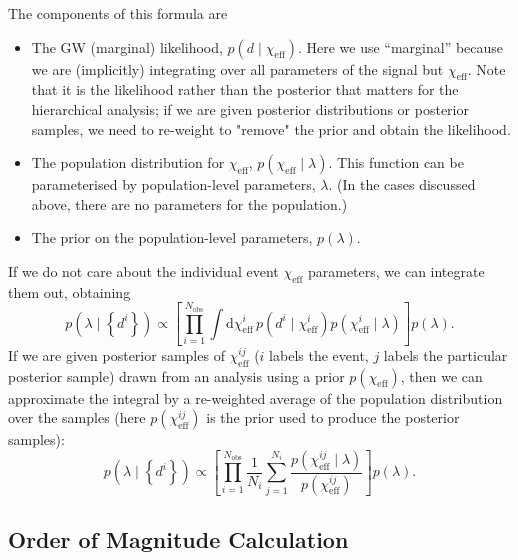 \documentclass[modern,linenumbers]{aastex61}
\newcommand{\chieff}{\chi_\mathrm{eff}}
\newcommand{\dd}{\mathrm{d}}
\begin{document}
The components of this formula are
\begin{itemize}
\item The GW (marginal) likelihood, $p\left(d \mid \chieff\right)$.
  Here we use ``marginal'' because we are (implicitly) integrating
  over all parameters of the signal but $\chieff$.  Note that it is
  the likelihood rather than the posterior that matters for the
  hierarchical analysis; if we are given posterior distributions or
  posterior samples, we need to re-weight to "remove" the prior and
  obtain the likelihood.
\item The population distribution for $\chieff$,
  $p\left( \chieff \mid \lambda \right)$.  This function can be
  parameterised by population-level parameters, $\lambda$.  (In the
  cases discussed above, there are no parameters for the population.)
\item The prior on the population-level parameters, $p(\lambda)$.
\end{itemize}
If we do not care about the individual event $\chieff$ parameters, we
can integrate them out, obtaining
\begin{equation}
  p\left( \lambda \mid \left\{ d^i \right\} \right) \propto \left[ \prod_{i=1}^{N_\mathrm{obs}} \int \dd \chieff^i \, p\left(d^i \mid \chieff^i \right) p\left( \chieff^i \mid \lambda \right) \right] p\left(\lambda\right).
\end{equation}
If we are given posterior samples of $\chieff^{ij}$ ($i$ labels the
event, $j$ labels the particular posterior sample) drawn from an
analysis using a prior $p\left( \chieff \right)$, then we can
approximate the integral by a re-weighted average of the population
distribution over the samples (here $p\left( \chieff^{ij} \right)$ is
the prior used to produce the posterior samples):
\begin{equation}
  p\left( \lambda \mid \left\{ d^i \right\} \right) \propto \left[ \prod_{i=1}^{N_\mathrm{obs}} \frac{1}{N_i} \sum_{j=1}^{N_i} \frac{p\left( \chieff^{ij} \mid \lambda \right)}{p\left( \chieff^{ij} \right)} \right] p\left(\lambda\right).
\end{equation}

\subsection{Order of Magnitude Calculation}
\label{sec:om-odds-ratio}
\end{document}
